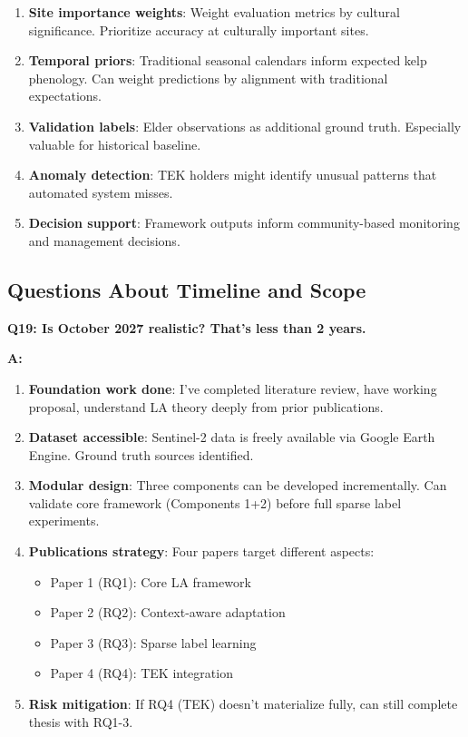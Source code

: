 \documentclass[11pt]{article}
\begin{document}
\begin{enumerate}
    \item \textbf{Site importance weights}: Weight evaluation metrics by cultural significance. Prioritize accuracy at culturally important sites.

    \item \textbf{Temporal priors}: Traditional seasonal calendars inform expected kelp phenology. Can weight predictions by alignment with traditional expectations.

    \item \textbf{Validation labels}: Elder observations as additional ground truth. Especially valuable for historical baseline.

    \item \textbf{Anomaly detection}: TEK holders might identify unusual patterns that automated system misses.

    \item \textbf{Decision support}: Framework outputs inform community-based monitoring and management decisions.
\end{enumerate}

\subsection{Questions About Timeline and Scope}

\textbf{Q19: Is October 2027 realistic? That's less than 2 years.}

\textbf{A:}

\begin{enumerate}
    \item \textbf{Foundation work done}: I've completed literature review, have working proposal, understand LA theory deeply from prior publications.

    \item \textbf{Dataset accessible}: Sentinel-2 data is freely available via Google Earth Engine. Ground truth sources identified.

    \item \textbf{Modular design}: Three components can be developed incrementally. Can validate core framework (Components 1+2) before full sparse label experiments.

    \item \textbf{Publications strategy}: Four papers target different aspects:
    \begin{itemize}
        \item Paper 1 (RQ1): Core LA framework
        \item Paper 2 (RQ2): Context-aware adaptation
        \item Paper 3 (RQ3): Sparse label learning
        \item Paper 4 (RQ4): TEK integration
    \end{itemize}

    \item \textbf{Risk mitigation}: If RQ4 (TEK) doesn't materialize fully, can still complete thesis with RQ1-3.
\end{enumerate}
\end{document}

